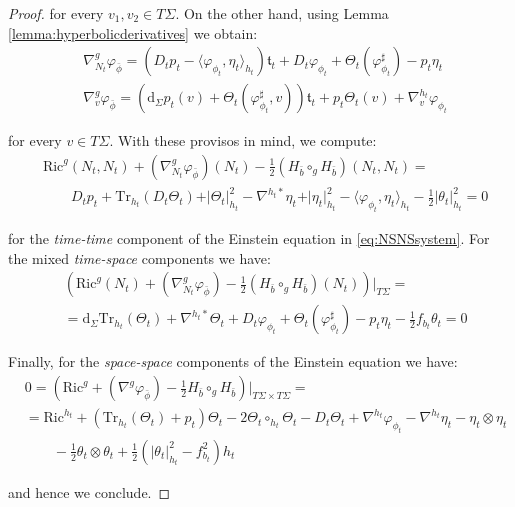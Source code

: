 \documentclass[10pt,reqno,a4paper]{amsart}
\theoremstyle{plain}
\theoremstyle{definition}
\theoremstyle{remark}
\theoremstyle{remark}
\def\dd{\mathrm{d}}
\newcommand{\Tr}{\mathrm{Tr}}
\newcommand{\Ric}{\mathrm{Ric}}
\renewcommand{\(}{ (}
\renewcommand{\)}{ )}
\begin{document}
\begin{proof}
\noindent
for every $v_1 ,v_2 \in T\Sigma$. On the other hand, using Lemma \ref{lemma:hyperbolicderivatives} we obtain:
\begin{eqnarray*}
& \nabla^{g}_{N_t}\varphi_{\bar{\phi}} = (D_tp_t-\langle\varphi_{\phi_t},\eta_t\rangle_{h_t})\mathfrak{t}_t+D_t\varphi_{\phi_t}+\Theta_t(\varphi_{\phi_t}^{\sharp})-p_t\eta_t\\
& \nabla^{g}_v \varphi_{\bar{\phi}} = (\dd_{\Sigma}p_t(v)+\Theta_t(\varphi_{\phi_t}^{\sharp},v))\mathfrak{t}_t+p_t\Theta_t(v)+\nabla^{h_t}_v\varphi_{\phi_t}
\end{eqnarray*}

\noindent
for every $v \in T\Sigma$. With these provisos in mind, we compute:
\begin{eqnarray*}
& \Ric^g(N_t , N_t) + (\nabla^g_{N_t}\varphi_{\bar{\phi}})(N_t) - \frac{1}{2} (H_{\bar{b}}\circ_{g} H_{\bar{b}}) (N_t , N_t) =\\
& \qquad D_tp_t+\Tr_{h_t}(D_t\Theta_t)+\vert\Theta_t\vert_{h_t}^2-\nabla^{h_t\ast}\eta_t+\vert\eta_t\vert_{h_t}^2 - \langle\varphi_{\phi_t},\eta_t\rangle_{h_t}-\frac{1}{2}\vert\theta_t\vert_{h_t}^2 = 0
\end{eqnarray*}

\noindent
for the \emph{time-time} component of the Einstein equation in \eqref{eq:NSNSsystem}. For the mixed \emph{time-space} components we have:
\begin{eqnarray*}
& (\Ric^g(N_t) + (\nabla^g_{N_t}\varphi_{\bar{\phi}})  - \frac{1}{2} (H_{\bar{b}}\circ_{g} H_{\bar{b}}) (N_t ))\vert_{T\Sigma} = \\
& = \dd_{\Sigma} \Tr_{h_t}(\Theta_t) + \nabla^{h_t\ast}\Theta_t+D_t\varphi_{\phi_t}+\Theta_t(\varphi_{\phi_t}^{\sharp})-p_t\eta_t-\frac{1}{2}f_{b_t}\theta_t = 0
\end{eqnarray*}

\noindent
Finally, for the \emph{space-space} components of the Einstein equation we have:
\begin{eqnarray*}
& 0 = (\Ric^g  + (\nabla^g \varphi_{\bar{\phi}})  - \frac{1}{2} H_{\bar{b}}\circ_{g} H_{\bar{b}})\vert_{T\Sigma\times T\Sigma} = \\
& = \Ric^{h_t} + (\Tr_{h_t}(\Theta_t) + p_t) \Theta_t - 2 \Theta_t\circ_{h_t} \Theta_t - D_t \Theta_t + \nabla^{h_t} \varphi_{\phi_t}-\nabla^{h_t}\eta_t-\eta_t\otimes\eta_t\\
& \qquad - \frac{1}{2} \theta_t \otimes \theta_t + \frac{1}{2} (\vert \theta_t\vert_{h_t}^2 - f_{b_t}^2) h_t 
\end{eqnarray*}

\noindent
and hence we conclude. 
\end{proof}
\end{document}
